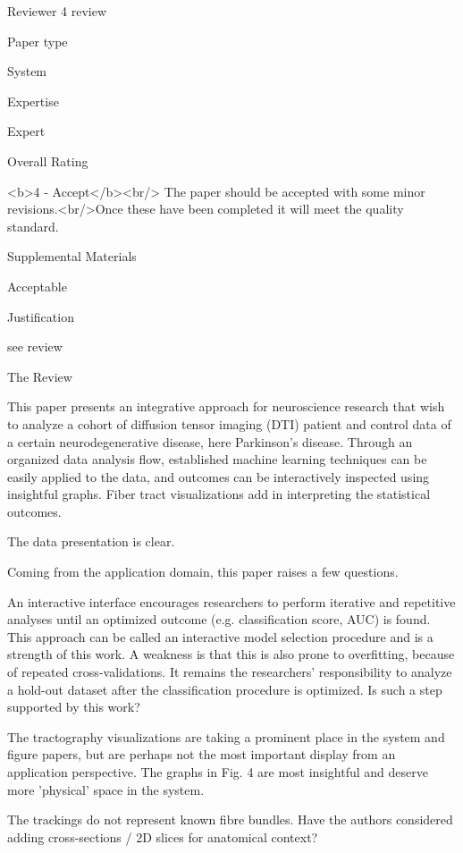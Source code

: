 Reviewer 4 review

  Paper type

    System

  Expertise

    Expert

  Overall Rating

    <b>4 - Accept</b><br/> The paper should be accepted with some minor
    revisions.<br/>Once these have been completed it will meet the quality standard.

  Supplemental Materials

    Acceptable

  Justification

    see review

  The Review

    This paper presents an integrative approach for neuroscience research that wish to
    analyze a cohort of diffusion tensor imaging (DTI) patient and control data of a
    certain neurodegenerative disease, here Parkinson's disease.
    Through an organized data analysis flow, established machine learning techniques
    can be easily applied to the data, and outcomes can be interactively inspected
    using insightful graphs. Fiber tract visualizations add in interpreting the
    statistical outcomes.

    The data presentation is clear.

    Coming from the application domain, this paper raises a few questions.

    An interactive interface encourages researchers to perform iterative and
    repetitive analyses until an optimized outcome (e.g. classification score, AUC) is
    found. This approach can be called an interactive model selection procedure and is
    a strength of this work. A weakness is that this is also prone to overfitting,
    because of repeated cross-validations. It remains the researchers' responsibility
    to analyze a hold-out dataset after the classification procedure is optimized. Is
    such a step supported by this work?

    The tractography visualizations are taking a prominent place in the system and
    figure papers, but are perhaps not the most important display from an application
    perspective. The graphs in Fig. 4 are most insightful and deserve more 'physical'
    space in the system.

    The trackings do not represent known fibre bundles. Have the authors considered
    adding cross-sections / 2D slices for anatomical context?

